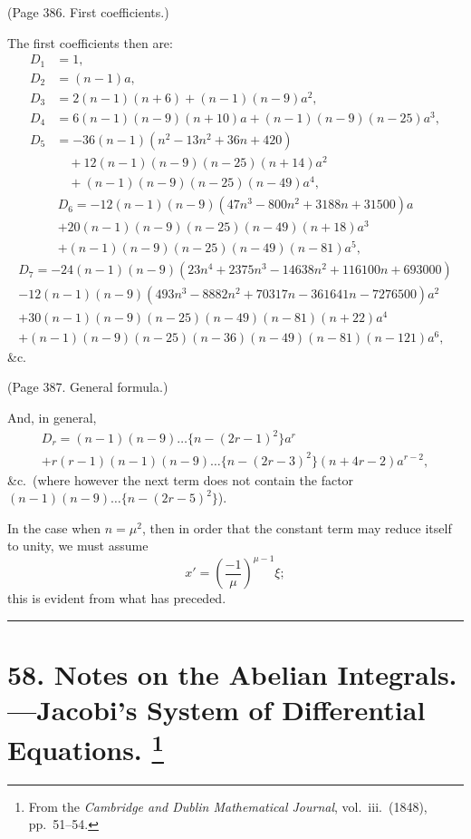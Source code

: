 \documentclass[11pt,a4paper]{book}
\begin{document}
(Page 386. First coefficients.)

The first coefficients then are:
\begin{align*}
D_1 &= 1, \\
D_2 &= (n-1)a, \\
D_3 &= 2(n-1)(n+6) + (n-1)(n-9)a^2, \\
D_4 &= 6(n-1)(n-9)(n+10)a + (n-1)(n-9)(n-25)a^3, \\
D_5 &= -36(n-1)(n^2 - 13n^2 + 36n + 420) \\
&\quad + 12(n-1)(n-9)(n-25)(n+14)a^2 \\
&\quad + (n-1)(n-9)(n-25)(n-49)a^4,
\end{align*}
\begin{multline*}
D_6 = -12(n-1)(n-9)(47n^3 - 800n^2 + 3188n + 31500)a \\
+ 20(n-1)(n-9)(n-25)(n-49)(n+18)a^3 \\
+ (n-1)(n-9)(n-25)(n-49)(n-81)a^5,
\end{multline*}
\begin{multline*}
D_7 = -24(n-1)(n-9)(23n^4 + 2375n^3 - 14638n^2 + 116100n + 693000) \\
- 12(n-1)(n-9)(493n^3 - 8882n^2 + 70317n - 361641n - 7276500)a^2 \\
+ 30(n-1)(n-9)(n-25)(n-49)(n-81)(n+22)a^4 \\
+ (n-1)(n-9)(n-25)(n-36)(n-49)(n-81)(n-121)a^6,
\end{multline*}
\&c.

(Page 387. General formula.)

And, in general,
\begin{multline*}
D_r = (n-1)(n-9)\ldots\{n - (2r-1)^2\} a^r \\
+ r(r-1)(n-1)(n-9)\ldots\{n - (2r-3)^2\}(n + 4r - 2) a^{r-2},
\end{multline*}
\&c.\ (where however the next term does not contain the factor
$(n-1)(n-9)\ldots\{n - (2r-5)^2\}$).

In the case when $n = \mu^2$, then in order that the constant term may reduce itself
to unity, we must assume
\[
x' = \left(\frac{-1}{\mu}\right)^{\mu-1} \xi;
\]
this is evident from what has preceded.

\bigskip
\hrule
\bigskip

\newpage
\section[Notes on the Abelian Integrals]{%
58. Notes on the Abelian Integrals.---Jacobi's System of Differential Equations.%
\footnote{From the \textit{Cambridge and Dublin Mathematical Journal}, vol.~iii.\ (1848), pp.~51--54.}}
\end{document}

